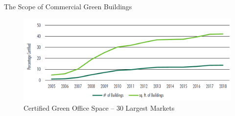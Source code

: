 \documentclass[11pt]{beamer}
\begin{document}

\begin{frame}{The Scope of Commercial Green Buildings}

\begin{figure}
\centering
\caption{Certified Green Office Space -- 30 Largest Markets \citep{GBAI2019}}
\includegraphics[width = \linewidth]{certOfficeSpace.png}
\end{figure}

\end{frame}


%
%


\end{document}
